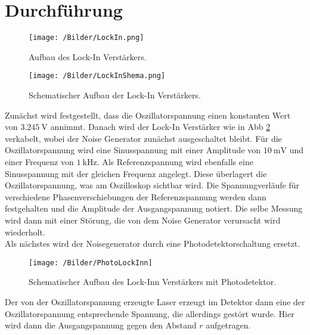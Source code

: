 \section{Durchführung}

\begin{figure}[H]
    \centering
    \texttt{[image: /Bilder/LockIn.png]}
    \caption{Aufbau des Lock-In Verstärkers.}
    \label{fig:LockIn}
\end{figure}
\begin{figure}[H]
    \centering
    \texttt{[image: /Bilder/LockInShema.png]}
    \caption{Schematischer Aufbau der Lock-In Verstärkers.}
    \label{fig:LockInSchema}
\end{figure}

\noindent Zunächst wird festgestellt, dass die Oszillatorspannung einen konstanten Wert von $\qty{3,245}{\volt}$ annimmt.
Danach wird der Lock-In Verstärker wie in Abb \ref{fig:LockInSchema} verkabelt, wobei der Noise Generator zunächst ausgeschaltet bleibt.
Für die Oszillatorspannung wird eine Sinusspannung mit einer Amplitude von $\qty{10}{\milli\volt}$ und einer Frequenz von 
$\qty{1}{\kilo\hertz}$. Als Referenzspannung wird ebenfalls eine Sinusspannung mit der gleichen Frequenz angelegt. Diese überlagert
die Oszillatorspannung, was am Oszilloskop sichtbar wird. Die Spannungverläufe für verschiedene Phasenverschiebungen der Referenzspannung
werden dann festgehalten und die Amplitude der Ausgangspannung notiert. Die selbe Messung wird dann mit einer Störung, die 
von dem Noise Generator verursacht wird wiederholt. \\

Als nächstes wird der Noisegenerator durch eine Photodetektorschaltung ersetzt.
\begin{figure}[H]
    \centering
    \texttt{[image: /Bilder/PhotoLockInn]}
    \caption{Schematischer Aufbau des Lock-Inn Verstärkers mit Photodetektor.}
    \label{fig:photo}
\end{figure}
Der von der Oszillatorspannung erzeugte Laser erzeugt im Detektor dann eine der Oszillatorspannung entsprechende Spannung, die 
allerdings gestört wurde. Hier wird dann die Ausgangspannung gegen den Abstand $r$ aufgetragen.

\label{sec:Durchführung}
